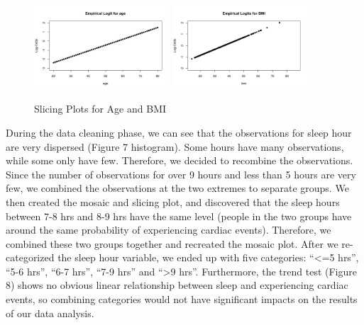 \documentclass[12pt]{article}
\begin{document}
\begin{figure}[!ht]
\centering
\includegraphics[width=0.45\textwidth]{Img/Empirical Logit for Age.png}
\includegraphics[width=0.45\textwidth]{Img/Empirical Logits for BMI.png}
\caption{Slicing Plots for Age and BMI}
\end{figure}

During the data cleaning phase, we can see that the observations for sleep hour are very dispersed (Figure 7 histogram). Some hours have many observations, while some only have few. Therefore, we decided to recombine the observations. Since the number of observations for over 9 hours and less than 5 hours are very few, we combined the observations at the two extremes to separate groups. We then created the mosaic and slicing plot, and discovered that the sleep hours between 7-8 hrs and 8-9 hrs have the same level (people in the two groups have around the same probability of experiencing cardiac events). Therefore, we combined these two groups together and recreated the mosaic plot. After we re-categorized the sleep hour variable, we ended up with five categories: “<=5 hrs”, “5-6 hrs”, “6-7 hrs”, “7-9 hrs” and “>9 hrs”. Furthermore, the trend test (Figure 8) shows no obvious linear relationship between sleep and experiencing cardiac events, so combining categories would not have significant impacts on the results of our data analysis.
\end{document}
